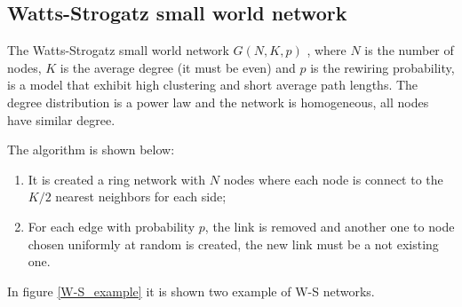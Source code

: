 \subsection{Watts-Strogatz small world network}

The Watts-Strogatz small world network $G(N, K, p)$ \cite{Watts-Strogatz_1998}, where $N$ is the number of nodes, $K$ is the average degree (it must be even) and $p$ is the rewiring probability, is a model that exhibit high clustering and short average path lengths. The degree distribution is a power law and the network is homogeneous, all nodes have similar degree.

The algorithm is shown below:
\begin{enumerate}
    \item It is created a ring network with $N$ nodes where each node is connect to the $K/2$ nearest neighbors for each side;
    \item For each edge with probability $p$, the link is removed and another one to node chosen uniformly at random is created, the new link must be a not existing one.
\end{enumerate}

In figure \ref{W-S_example} it is shown two example of W-S networks.

